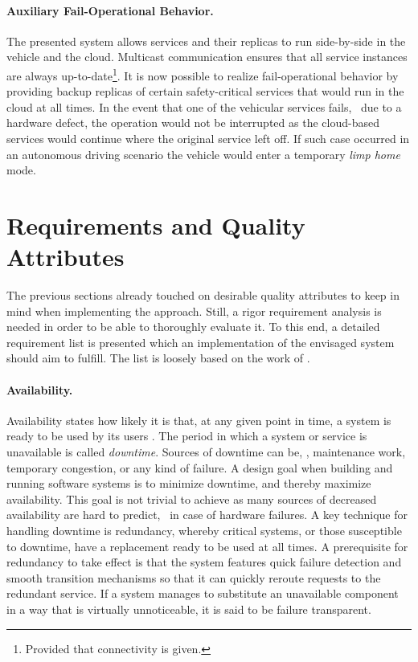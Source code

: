 \paragraph{Auxiliary Fail-Operational Behavior.}
The presented system allows services and their replicas to run side-by-side in the vehicle and the cloud. Multicast communication ensures that all service instances are always up-to-date\footnote{Provided that connectivity is given.}. It is now possible to realize fail-operational behavior by providing backup replicas of certain safety-critical services that would run in the cloud at all times. In the event that one of the vehicular services fails, \eg\ due to a hardware defect, the operation would not be interrupted as the cloud-based services would continue where the original service left off. If such case occurred in an autonomous driving scenario the vehicle would enter a temporary \emph{limp home} mode.
%
%
%
%
%
%
%
%
%
%
\section{Requirements and Quality Attributes} \label{sec:requirements}
The previous sections already touched on desirable quality attributes to keep in mind when implementing the approach. Still, a rigor requirement analysis is needed in order to be able to thoroughly evaluate it. To this end, a detailed requirement list is presented which an implementation of the envisaged system should aim to fulfill. The list is loosely based on the work of \citeauthor*{o2007quality} \cite{o2007quality}.


\paragraph{Availability.}
Availability states how likely it is that, at any given point in time, a system is ready to be used by its users \cite{tanenbaum2017distributed}. The period in which a system or service is unavailable is called \emph{downtime}. Sources of downtime can be, \eg , maintenance work, temporary congestion, or any kind of failure. A design goal when building and running software systems is to minimize downtime, and thereby maximize availability. This goal is not trivial to achieve as many sources of decreased availability are hard to predict, \eg\ in case of hardware failures. A key technique for handling downtime is redundancy, whereby critical systems, or those susceptible to downtime, have a replacement ready to be used at all times. A prerequisite for redundancy to take effect is that the system features quick failure detection and smooth transition mechanisms so that it can quickly reroute requests to the redundant service. If a system manages to substitute an unavailable component in a way that is virtually unnoticeable, it is said to be failure transparent.

